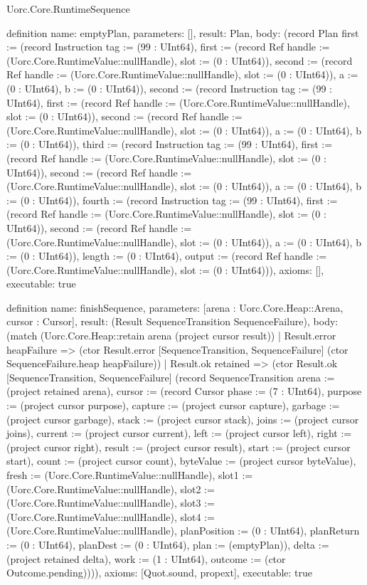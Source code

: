 \begin{lexlean}{Uorc.Core.RuntimeSequence}
\begin{semanticmodule}
definition{
  name: emptyPlan,
  parameters: [],
  result: Plan,
  body: (record Plan {first := (record Instruction {tag := (99 : UInt64), first := (record Ref {handle := (Uorc.Core.RuntimeValue::nullHandle), slot := (0 : UInt64)}), second := (record Ref {handle := (Uorc.Core.RuntimeValue::nullHandle), slot := (0 : UInt64)}), a := (0 : UInt64), b := (0 : UInt64)}), second := (record Instruction {tag := (99 : UInt64), first := (record Ref {handle := (Uorc.Core.RuntimeValue::nullHandle), slot := (0 : UInt64)}), second := (record Ref {handle := (Uorc.Core.RuntimeValue::nullHandle), slot := (0 : UInt64)}), a := (0 : UInt64), b := (0 : UInt64)}), third := (record Instruction {tag := (99 : UInt64), first := (record Ref {handle := (Uorc.Core.RuntimeValue::nullHandle), slot := (0 : UInt64)}), second := (record Ref {handle := (Uorc.Core.RuntimeValue::nullHandle), slot := (0 : UInt64)}), a := (0 : UInt64), b := (0 : UInt64)}), fourth := (record Instruction {tag := (99 : UInt64), first := (record Ref {handle := (Uorc.Core.RuntimeValue::nullHandle), slot := (0 : UInt64)}), second := (record Ref {handle := (Uorc.Core.RuntimeValue::nullHandle), slot := (0 : UInt64)}), a := (0 : UInt64), b := (0 : UInt64)}), length := (0 : UInt64), output := (record Ref {handle := (Uorc.Core.RuntimeValue::nullHandle), slot := (0 : UInt64)})}),
  axioms: [],
  executable: true
}

definition{
  name: finishSequence,
  parameters: [arena : Uorc.Core.Heap::Arena, cursor : Cursor],
  result: (Result SequenceTransition SequenceFailure),
  body: (match (Uorc.Core.Heap::retain arena (project cursor result))
    | Result.error heapFailure => (ctor Result.error [SequenceTransition, SequenceFailure] (ctor SequenceFailure.heap heapFailure))
    | Result.ok retained => (ctor Result.ok [SequenceTransition, SequenceFailure] (record SequenceTransition {arena := (project retained arena), cursor := (record Cursor {phase := (7 : UInt64), purpose := (project cursor purpose), capture := (project cursor capture), garbage := (project cursor garbage), stack := (project cursor stack), joins := (project cursor joins), current := (project cursor current), left := (project cursor left), right := (project cursor right), result := (project cursor result), start := (project cursor start), count := (project cursor count), byteValue := (project cursor byteValue), fresh := (Uorc.Core.RuntimeValue::nullHandle), slot1 := (Uorc.Core.RuntimeValue::nullHandle), slot2 := (Uorc.Core.RuntimeValue::nullHandle), slot3 := (Uorc.Core.RuntimeValue::nullHandle), slot4 := (Uorc.Core.RuntimeValue::nullHandle), planPosition := (0 : UInt64), planReturn := (0 : UInt64), planDest := (0 : UInt64), plan := (emptyPlan)}), delta := (project retained delta), work := (1 : UInt64), outcome := (ctor Outcome.pending)}))),
  axioms: [Quot.sound, propext],
  executable: true
}


\end{semanticmodule}
\end{lexlean}
